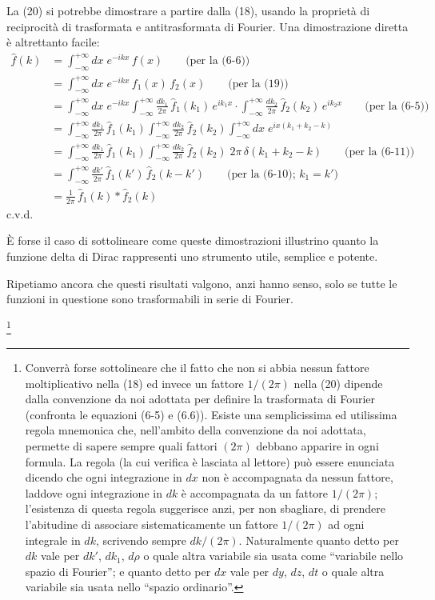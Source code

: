 \documentclass[11pt, a4paper]{book}
\numberwithin{equation}{section}
\begin{document}
La (20) si potrebbe dimostrare a partire dalla (18), usando la proprietà di reciprocità di trasformata e antitrasformata di Fourier. Una dimostrazione diretta è altrettanto facile:
\begin{align*}
  \hat{f}(k) &= \int_{-\infty}^{+\infty} dx\;e^{-ikx}\,f(x)
    \qquad\text{(per la (6-6))}\\
  &= \int_{-\infty}^{+\infty} dx\;e^{-ikx}\,f_1(x)\,f_2(x)
    \qquad\text{(per la (19))}\\
  &= \int_{-\infty}^{+\infty} dx\;e^{-ikx}
    \int_{-\infty}^{+\infty}\frac{dk_1}{2\pi}\,\hat{f}_1(k_1)\,e^{ik_1 x}
    \cdot\int_{-\infty}^{+\infty}\frac{dk_2}{2\pi}\,\hat{f}_2(k_2)\,e^{ik_2 x}
    \qquad\text{(per la (6-5))}\\
  &= \int_{-\infty}^{+\infty}\frac{dk_1}{2\pi}\,\hat{f}_1(k_1)
    \int_{-\infty}^{+\infty}\frac{dk_2}{2\pi}\,\hat{f}_2(k_2)
    \int_{-\infty}^{+\infty} dx\;e^{ix(k_1+k_2-k)}\\
  &= \int_{-\infty}^{+\infty}\frac{dk_1}{2\pi}\,\hat{f}_1(k_1)
    \int_{-\infty}^{+\infty}\frac{dk_2}{2\pi}\,\hat{f}_2(k_2)\;
    2\pi\,\delta(k_1+k_2-k)
    \qquad\text{(per la (6-11))}\\
  &= \int_{-\infty}^{+\infty}\frac{dk'}{2\pi}\,\hat{f}_1(k')\,\hat{f}_2(k-k')
    \qquad\text{(per la (6-10); } k_1=k'\text{)}\\
  &= \frac{1}{2\pi}\,\hat{f}_1(k)*\hat{f}_2(k)
\end{align*}
c.v.d.

È forse il caso di sottolineare come queste dimostrazioni illustrino quanto la funzione delta di Dirac rappresenti uno strumento utile, semplice e potente.

Ripetiamo ancora che questi risultati valgono, anzi hanno senso, solo se tutte le funzioni in questione sono trasformabili in serie di Fourier.

\footnote{Converrà forse sottolineare che il fatto che non si abbia nessun fattore moltiplicativo nella (18) ed invece un fattore $1/(2\pi)$ nella (20) dipende dalla convenzione da noi adottata per definire la trasformata di Fourier (confronta le equazioni (6-5) e (6.6)). Esiste una semplicissima ed utilissima regola mnemonica che, nell'ambito della convenzione da noi adottata, permette di sapere sempre quali fattori $(2\pi)$ debbano apparire in ogni formula. La regola (la cui verifica è lasciata al lettore) può essere enunciata dicendo che ogni integrazione in $dx$ non è accompagnata da nessun fattore, laddove ogni integrazione in $dk$ è accompagnata da un fattore $1/(2\pi)$; l'esistenza di questa regola suggerisce anzi, per non sbagliare, di prendere l'abitudine di associare sistematicamente un fattore $1/(2\pi)$ ad ogni integrale in $dk$, scrivendo sempre $dk/(2\pi)$. Naturalmente quanto detto per $dk$ vale per $dk'$, $dk_1$, $d\rho$ o quale altra variabile sia usata come ``variabile nello spazio di Fourier''; e quanto detto per $dx$ vale per $dy$, $dz$, $dt$ o quale altra variabile sia usata nello ``spazio ordinario''.}
\end{document}

